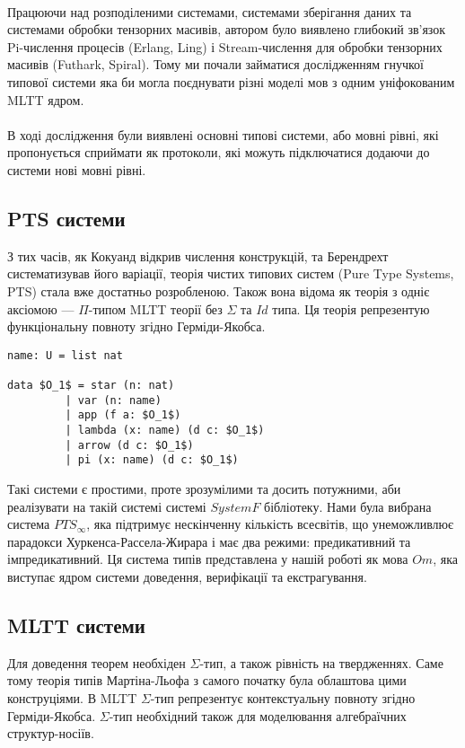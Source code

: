 \paragraph{}
Працюючи над розподіленими системами, системами зберігання даних та
системами обробки тензорних масивів, автором було виявлено глибокий
зв'язок Pi-числення процесів (Erlang, Ling) і Stream-числення для обробки
тензорних масивів (Futhark, Spiral). Тому ми почали займатися дослідженням
гнучкої типової системи яка би могла поєднувати різні моделі мов з одним
уніфокованим MLTT ядром.

\paragraph{}
В ході дослідження були виявлені основні типові системи, або мовні рівні, які
пропонується сприймати як протоколи, які можуть підключатися додаючи до
системи нові мовні рівні.

\subsection{PTS системи}
З тих часів, як Кокуанд відкрив числення конструкцій, та Берендрехт систематизував його варіації,
теорія чистих типових систем (Pure Type Systems, PTS) стала вже достатньо розробленою.
Також вона відома як теорія з одніє аксіомою --- $\Pi$-типом MLTT теорії без $\Sigma$ та $Id$ типа. Ця теорія репрезентую функціональну повноту
згідно Герміди-Якобса.

\begin{lstlisting}[mathescape=true]
name: U = list nat

data $O_1$ = star (n: nat)
         | var (n: name)
         | app (f a: $O_1$)
         | lambda (x: name) (d c: $O_1$)
         | arrow (d c: $O_1$)
         | pi (x: name) (d c: $O_1$)
\end{lstlisting}

Такі системи є простими, проте зрозумілими та досить потужними, аби реалізувати на такій системі
системі $System F$ бібліотеку. Нами була вибрана система $PTS_{\infty}$,
яка підтримує нескінченну кількість всесвітів, що унеможливлює парадокси Хуркенса-Рассела-Жирара
і має два режими: предикативний та імпредикативний. Ця система типів представлена
у нашій роботі як мова $Om$, яка виступає ядром системи доведення, верифікації та екстрагування.

\newpage
\subsection{MLTT системи}
Для доведення теорем необхіден $\Sigma$-тип, а також рівність на твердженнях.
Саме тому теорія типів Мартіна-Льофа з самого початку була облаштова цими конструціями.
В MLTT $\Sigma$-тип репрезентує контекстуальну повноту згідно Герміди-Якобса.
$\Sigma$-тип необхідний також для моделювання алгебраїчних структур-носіїв.

